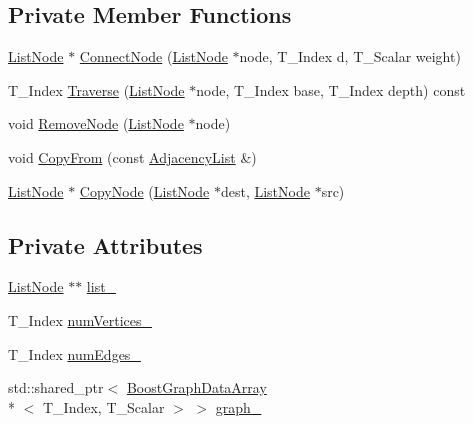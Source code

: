 \subsection*{Private Member Functions}
\begin{DoxyCompactItemize}
\item 
\hyperlink{struct_undirected_weighted_graph_1_1_adjacency_list_1_1_list_node}{List\+Node} $\ast$ \hyperlink{class_undirected_weighted_graph_1_1_adjacency_list_a7b606dad8cbec354470404732aebf5e8}{Connect\+Node} (\hyperlink{struct_undirected_weighted_graph_1_1_adjacency_list_1_1_list_node}{List\+Node} $\ast$node, T\+\_\+\+Index d, T\+\_\+\+Scalar weight)
\item 
T\+\_\+\+Index \hyperlink{class_undirected_weighted_graph_1_1_adjacency_list_ae4dbfea7c41e1b33b5da2a60553b07b1}{Traverse} (\hyperlink{struct_undirected_weighted_graph_1_1_adjacency_list_1_1_list_node}{List\+Node} $\ast$node, T\+\_\+\+Index base, T\+\_\+\+Index depth) const 
\item 
void \hyperlink{class_undirected_weighted_graph_1_1_adjacency_list_a535a99e8c65ad9aa76f4b47c93b1a802}{Remove\+Node} (\hyperlink{struct_undirected_weighted_graph_1_1_adjacency_list_1_1_list_node}{List\+Node} $\ast$node)
\item 
void \hyperlink{class_undirected_weighted_graph_1_1_adjacency_list_a2af1438d6aeb43e21a7ca8966cec2c8a}{Copy\+From} (const \hyperlink{class_undirected_weighted_graph_1_1_adjacency_list}{Adjacency\+List} \&)
\item 
\hyperlink{struct_undirected_weighted_graph_1_1_adjacency_list_1_1_list_node}{List\+Node} $\ast$ \hyperlink{class_undirected_weighted_graph_1_1_adjacency_list_a121be048d41052d84c3805789103283c}{Copy\+Node} (\hyperlink{struct_undirected_weighted_graph_1_1_adjacency_list_1_1_list_node}{List\+Node} $\ast$dest, \hyperlink{struct_undirected_weighted_graph_1_1_adjacency_list_1_1_list_node}{List\+Node} $\ast$src)
\end{DoxyCompactItemize}
\subsection*{Private Attributes}
\begin{DoxyCompactItemize}
\item 
\hyperlink{struct_undirected_weighted_graph_1_1_adjacency_list_1_1_list_node}{List\+Node} $\ast$$\ast$ \hyperlink{class_undirected_weighted_graph_1_1_adjacency_list_a6e46162121cb122f3ba430c7a2528cac}{list\+\_\+}
\item 
T\+\_\+\+Index \hyperlink{class_undirected_weighted_graph_1_1_adjacency_list_a32595c1491afb41034135ceb07eadb4d}{num\+Vertices\+\_\+}
\item 
T\+\_\+\+Index \hyperlink{class_undirected_weighted_graph_1_1_adjacency_list_a383bf107a02d24417f668c9cb175959f}{num\+Edges\+\_\+}
\item 
std\+::shared\+\_\+ptr$<$ \hyperlink{struct_undirected_weighted_graph_1_1_graph_array}{BoostGraphData\+Array}\\*
$<$ T\+\_\+\+Index, T\+\_\+\+Scalar $>$ $>$ \hyperlink{class_undirected_weighted_graph_1_1_adjacency_list_a9fa1388a2f0ec3c1428da65604290bdf}{graph\+\_\+}
\end{DoxyCompactItemize}


